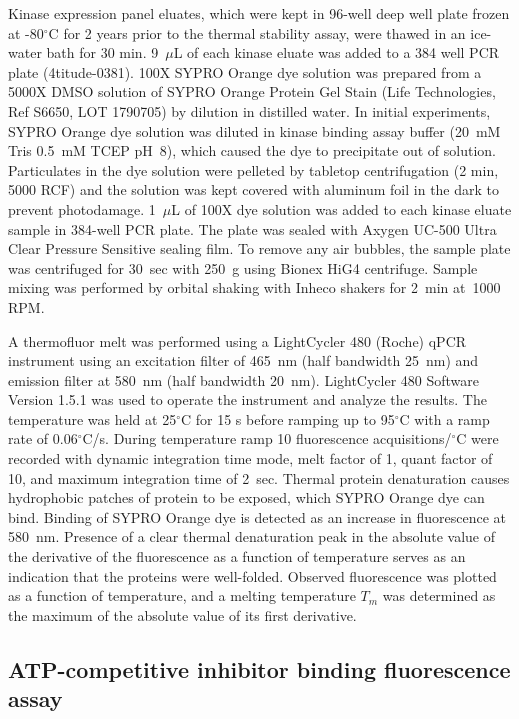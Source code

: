 \documentclass[phd,tocprelim]{cornell}
\begin{document}
Kinase expression panel eluates, which were kept in 96-well deep well plate frozen at -80$^{\circ}$C for 2 years prior to the thermal stability assay, were thawed in an ice-water bath for 30 min. 9~$\mu$L of each kinase eluate was added to a 384 well PCR plate (4titude-0381). 
100X SYPRO Orange dye solution was prepared from a 5000X DMSO solution of SYPRO Orange Protein Gel Stain (Life Technologies, Ref S6650, LOT 1790705) by dilution in distilled water. In initial experiments, SYPRO Orange dye solution was diluted in kinase binding assay buffer (20~mM Tris 0.5~mM TCEP pH~8), which caused the dye to precipitate out of solution. 
Particulates in the dye solution were pelleted by tabletop centrifugation (2 min, 5000 RCF) and the solution was kept covered with aluminum foil in the dark to prevent photodamage. 
1~$\mu$L of 100X dye solution was added to each kinase eluate sample in 384-well PCR plate. 
The plate was sealed with Axygen UC-500 Ultra Clear Pressure Sensitive sealing film. 
To remove any air bubbles, the sample plate was centrifuged for 30~sec with 250~g using Bionex HiG4 centrifuge. 
Sample mixing was performed by orbital shaking with Inheco shakers for 2~min at~1000 RPM.

A thermofluor melt was performed using a LightCycler 480 (Roche) qPCR instrument using an excitation filter of 465~nm (half bandwidth 25~nm) and emission filter at 580~nm (half bandwidth 20~nm). 
LightCycler 480 Software Version 1.5.1 was used to operate the instrument and analyze the results. 
The temperature was held at 25$^{\circ}$C for 15 s before ramping up to 95$^{\circ}$C with a ramp rate of 0.06$^{\circ}$C/s.  
During temperature ramp 10 fluorescence acquisitions/$^{\circ}$C were recorded with dynamic integration time mode, melt factor of 1, quant factor of 10, and maximum integration time of 2~sec.  
Thermal protein denaturation causes hydrophobic patches of protein to be exposed, which SYPRO Orange dye can bind. 
Binding of SYPRO Orange dye is detected as an increase in fluorescence at 580~nm. 
Presence of a clear thermal denaturation peak in the absolute value of the derivative of the fluorescence as a function of temperature serves as an indication that the proteins were well-folded. 
Observed fluorescence was plotted as a function of temperature, and a melting temperature $T_m$ was determined as the maximum of the absolute value of its first derivative. 

\subsection{ATP-competitive inhibitor binding fluorescence assay}
\end{document}
